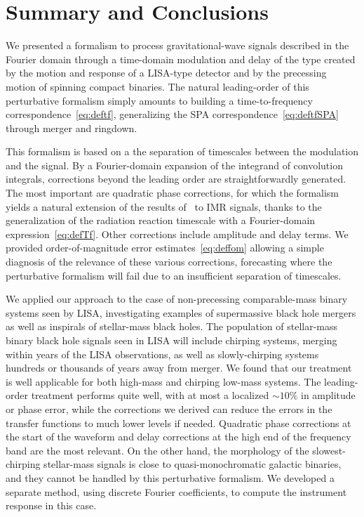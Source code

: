 \documentclass[aps,showpacs,twocolumn,
prd,superscriptaddress,nofootinbib]{revtex4-1}
\begin{document}

\section{Summary and Conclusions}
\label{sec:discussion}

We presented a formalism to process gravitational-wave signals described in the Fourier domain through a time-domain modulation and delay of the type created by the motion and response of a LISA-type detector and by the precessing motion of spinning compact binaries. The natural leading-order of this perturbative formalism simply amounts to building a time-to-frequency correspondence~\eqref{eq:deftf}, generalizing the SPA correspondence~\eqref{eq:deftfSPA} through merger and ringdown.

This formalism is based on a the separation of timescales between the modulation and the signal. By a Fourier-domain expansion of the integrand of convolution integrals, corrections beyond the leading order are straightforwardly generated. The most important are quadratic phase corrections, for which the formalism yields a natural extension of the results of~\cite{KCY14} to IMR signals, thanks to the generalization of the radiation reaction timescale with a Fourier-domain expression~\eqref{eq:defTf}. Other corrections include amplitude and delay terms. We provided order-of-magnitude error estimates~\eqref{eq:deffom} allowing a simple diagnosis of the relevance of these various corrections, forecasting where the perturbative formalism will fail due to an insufficient separation of timescales.

We applied our approach to the case of non-precessing comparable-mass binary systems seen by LISA, investigating examples of supermassive black hole mergers as well as inspirals of stellar-mass black holes. The population of stellar-mass binary black hole signals seen in LISA will include chirping systems, merging within years of the LISA observations, as well as slowly-chirping systems hundreds or thousands of years away from merger. We found that our treatment is well applicable for both high-mass and chirping low-mass systems. The leading-order treatment performs quite well, with at most a localized $\sim10\%$ in amplitude or phase error, while the corrections we derived can reduce the errors in the transfer functions to much lower levels if needed. Quadratic phase corrections at the start of the waveform and delay corrections at the high end of the frequency band are the most relevant. On the other hand, the morphology of the slowest-chirping stellar-mass signals is close to quasi-monochromatic galactic binaries, and they cannot be handled by this perturbative formalism. We developed a separate method, using discrete Fourier coefficients, to compute the instrument response in this case.
\end{document}
